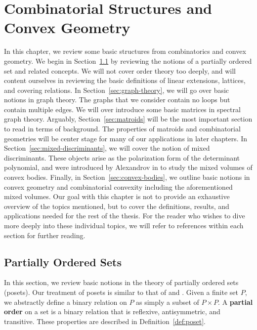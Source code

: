 \documentclass{puthesis-UG}
\begin{document}
\chapter{Combinatorial Structures and Convex Geometry}

In this chapter, we review some basic structures from combinatorics and convex geometry. We begin in Section~\ref{sec:posets} by reviewing the notions of a partially ordered set and related concepts. We will not cover order theory too deeply, and will content ourselves in reviewing the basic definitions of linear extensions, lattices, and covering relations. In Section~\ref{sec:graph-theory}, we will go over basic notions in graph theory. The graphs that we consider contain no loops but contain multiple edges. We will over introduce some basic matrices in spectral graph theory. Arguably, Section~\ref{sec:matroids} will be the most important section to read in terms of background. The properties of matroids and combinatorial geometries will be center stage for many of our applications in later chapters. In Section~\ref{sec:mixed-discriminants}, we will cover the notion of mixed discriminants. These objects arise as the polarization form of the determinant polynomial, and were introduced by Alexandrov in \cite{aleksandrov} to study the mixed volumes of convex bodies. Finally, in Section~\ref{sec:convex-bodies}, we outline basic notions in convex geometry and combinatorial convexity including the aforementioned mixed volumes. Our goal with this chapter is not to provide an exhaustive overview of the topics mentioned, but to cover the definitions, results, and applications needed for the rest of the thesis. For the reader who wishes to dive more deeply into these individual topics, we will refer to references within each section for further reading. 

\section{Partially Ordered Sets} \label{sec:posets}

In this section, we review basic notions in the theory of partially ordered sets (posets). Our treatment of posets is similar to that of \cite{ordered-sets} and \cite{Rota1964}. Given a finite set $P$, we abstractly define a binary relation on $P$ as simply a subset of $P \times P$. A \textbf{partial order} on a set is a binary relation that is reflexive, antisymmetric, and transitive. These properties are described in Definition~\ref{def:poset}. 
\end{document}
